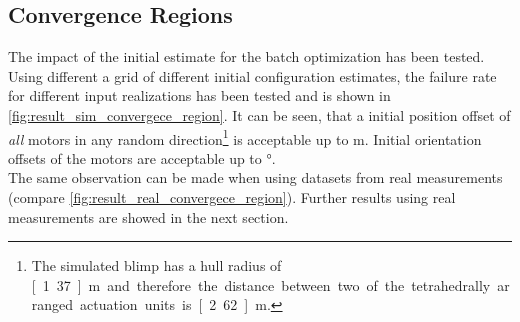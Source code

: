 \subsection{Convergence Regions}
The impact of the initial estimate for the batch optimization has been tested.
Using different a grid of different initial configuration estimates, the failure rate for different input realizations has been tested and is shown in \cref{fig:result_sim_convergece_region}.
It can be seen, that a initial position offset of \textit{all} motors in any random direction\footnote{
The simulated blimp has a hull radius of \unit[1.37]{m} and therefore the distance between two of the tetrahedrally arranged actuation units is \unit[2.62]{m}.}
is acceptable up to \unit[1]{m}.
Initial orientation offsets of the motors are acceptable up to \unit[120]{°}.
\\
The same observation can be made when using datasets from real measurements (compare \cref{fig:result_real_convergece_region}).
Further results using real measurements are showed in the next section.

